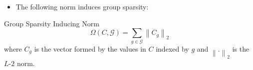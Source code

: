 \begin{frame}
\begin{itemize}
\begin{figure}
		\end{figure}

		\item The following norm induces group sparsity:
	\end{itemize}

	\begin{block}{Group Sparsity Inducing Norm}
		\begin{equation*}
			\Omega (C, \mathcal{G}) = \sum_{g \in \mathcal{G}} \left\lVert C_g \right\rVert _2
		\end{equation*}
		where $C_g$ is the vector formed by the values in $C$ indexed by $g$ and $\left\lVert . \right\rVert_2$ is
		the $L$-$2$ norm.
	\end{block}
\end{frame}


